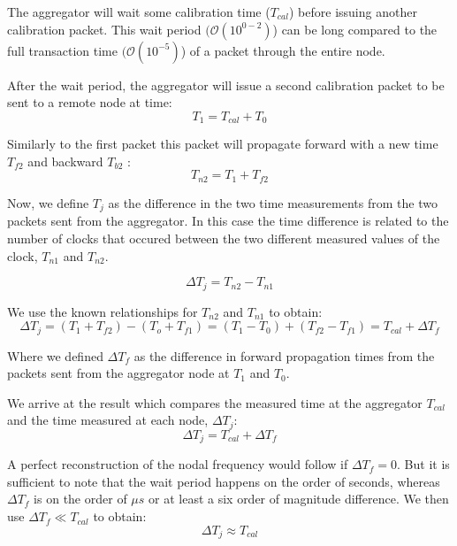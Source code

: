 The aggregator will wait some calibration time ($T_{cal}$) before issuing another calibration packet.
This wait period $(\mathcal{O}(10^{0-2})$) can be long compared to the full transaction time $(\mathcal{O}(10^{-5})$) of a packet through the entire node.

After the wait period, the aggregator will issue a second calibration packet to be sent to a remote node at time:
\begin{equation}
  T_{1} = T_{cal} + T_{0}
\end{equation}

Similarly to the first packet this packet will propagate forward with a new time $T_{f2}$ and backward $T_{b2}$ :
\begin{equation}
  T_{n2} = T_{1} + T_{f2}
\end{equation}

Now, we define $T_{j}$ as the difference in the two time measurements from the two packets sent from the aggregator.
In this case the time difference is related to the number of clocks that occured between the two different measured values of the clock, $T_{n1}$ and $T_{n2}$.

\begin{equation}
  \Delta T_{j} = T_{n2} - T_{n1}
\end{equation}

We use the known relationships for $T_{n2}$ and $T_{n1}$ to obtain:
\begin{equation}
  \Delta T_{j} = (T_{1} + T_{f2}) - (T_{o} + T_{f1}) = (T_{1} - T_{0}) + (T_{f2} - T_{f1}) = T_{cal} + \Delta T_{f}
\end{equation}

Where we defined $\Delta T_{f}$ as the difference in forward propagation times from the packets sent from the aggregator node at $T_{1}$ and $T_{0}$.

We arrive at the result which compares the measured time at the aggregator $T_{cal}$ and the time measured at each node, $\Delta T_{j}$:
\begin{equation}
  \Delta T_{j} = T_{cal} + \Delta T_{f}
\end{equation}

A perfect reconstruction of the nodal frequency would follow if $\Delta T_{f} = 0$.
But it is sufficient to note that the wait period happens on the order of seconds, whereas $\Delta T_{f}$ is on the order of $\mu s$ or at least a six order of magnitude difference.
We then use $\Delta T_{f} \ll T_{cal}$ to obtain:
\begin{equation}
  \Delta T_{j} \approx T_{cal}
\end{equation}

